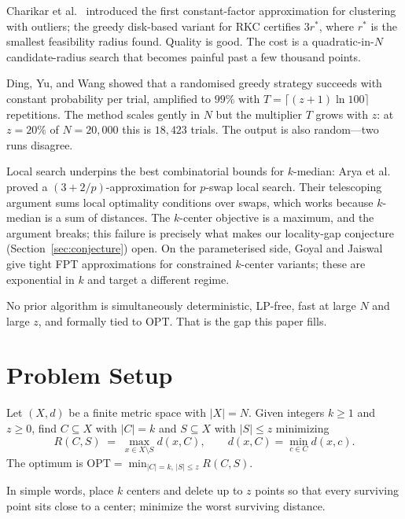\documentclass[twoside,leqno,twocolumn]{article}
\newcommand{\OPT}{\mathrm{OPT}}
\begin{document}
Charikar et al.\ \cite{charikar2001} introduced the first
constant-factor approximation for clustering with outliers; the greedy
disk-based variant for RKC certifies $3r^{*}$, where $r^{*}$ is the
smallest feasibility radius found. Quality is good. The cost is a
quadratic-in-$N$ candidate-radius search that becomes painful past a
few thousand points.

Ding, Yu, and Wang \cite{ding2019} showed that a randomised greedy
strategy succeeds with constant probability per trial, amplified to
$99\%$ with $T=\lceil(z{+}1)\ln 100\rceil$ repetitions. The method
scales gently in $N$ but the multiplier $T$ grows with $z$: at
$z=20\%$ of $N=20{,}000$ this is $18{,}423$ trials. The output is also
random---two runs disagree.

Local search underpins the best combinatorial bounds for $k$-median:
Arya et al.\ \cite{arya2004} proved a $(3+2/p)$-approximation for
$p$-swap local search. Their telescoping argument sums local
optimality conditions over swaps, which works because $k$-median is a
sum of distances. The $k$-center objective is a maximum, and the
argument breaks; this failure is precisely what makes our locality-gap
conjecture (Section~\ref{sec:conjecture}) open. On the parameterised
side, Goyal and Jaiswal \cite{goyal2021} give tight FPT approximations
for constrained $k$-center variants; these are exponential in $k$ and
target a different regime.

No prior algorithm is simultaneously deterministic, LP-free, fast at
large $N$ and large $z$, and formally tied to $\OPT$. That is the gap
this paper fills.


\section{Problem Setup}
\label{sec:setup}

Let $(X,d)$ be a finite metric space with $|X|=N$. Given integers
$k\ge 1$ and $z\ge 0$, find $C\subseteq X$ with $|C|=k$ and
$S\subseteq X$ with $|S|\le z$ minimizing
\[
  R(C,S) \;=\; \max_{x\in X\setminus S} d(x,C),
  \qquad d(x,C)=\min_{c\in C} d(x,c).
\]
The optimum is $\OPT = \min_{|C|=k,\,|S|\le z} R(C,S)$.

In simple words, place $k$ centers and delete up to $z$ points so that every surviving point sits close to a center; minimize the worst surviving distance.
\end{document}

